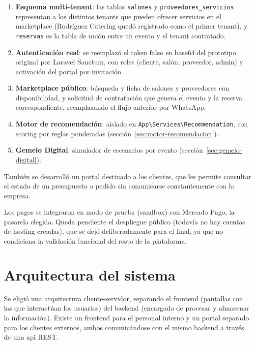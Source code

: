 \begin{enumerate}
    \item \textbf{Esquema multi-tenant}: las tablas \texttt{salones} y
          \texttt{proveedores\_servicios} representan a los distintos
          tenants que pueden ofrecer servicios en el marketplace (Rodríguez
          Catering quedó registrado como el primer tenant), y
          \texttt{reservas} es la tabla de unión entre un evento y el
          tenant contratado.
    \item \textbf{Autenticación real}: se reemplazó el token falso en
          base64 del prototipo original por Laravel Sanctum, con roles
          (cliente, salón, proveedor, admin) y activación del portal por
          invitación.
    \item \textbf{Marketplace público}: búsqueda y ficha de salones y
          proveedores con disponibilidad, y solicitud de contratación que
          genera el evento y la reserva correspondiente, reemplazando el
          flujo anterior por WhatsApp.
    \item \textbf{Motor de recomendación}: aislado en
          \texttt{App\textbackslash Services\textbackslash Recommendation},
          con scoring por reglas ponderadas (sección~\ref{sec:motor-recomendacion}).
    \item \textbf{Gemelo Digital}: simulador de escenarios por evento
          (sección~\ref{sec:gemelo-digital}).
\end{enumerate}

También se desarrolló un portal destinado a los clientes, que les permite
consultar el estado de un presupuesto o pedido sin comunicarse
constantemente con la empresa.

Los pagos se integraron en modo de prueba (sandbox) con Mercado Pago, la
pasarela elegida. Queda pendiente el despliegue público (todavía no hay
cuentas de hosting creadas), que se dejó deliberadamente para el final,
ya que no condiciona la validación funcional del resto de la
plataforma.

\section{Arquitectura del sistema}

Se eligió una arquitectura cliente-servidor, separando el frontend
(pantallas con las que interactúan los usuarios) del backend (encargado
de procesar y almacenar la información). Existe un frontend para el
personal interno y un portal separado para los clientes externos, ambos
comunicándose con el mismo backend a través de una \gls{api} REST.

